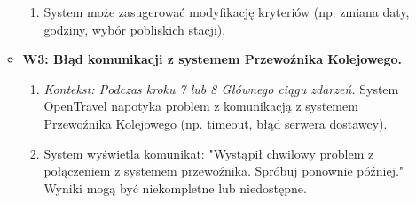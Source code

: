 \documentclass[a4paper,12pt]{article}
\begin{document}
\begin{itemize}
\begin{itemize}
\begin{enumerate}
\item System może zasugerować modyfikację kryteriów (np. zmiana daty, godziny, wybór pobliskich stacji).
\end{enumerate}
\item \textbf{W3: Błąd komunikacji z systemem Przewoźnika Kolejowego.}
\begin{enumerate}
\item \textit{Kontekst: Podczas kroku 7 lub 8 Głównego ciągu zdarzeń.} System OpenTravel napotyka problem z komunikacją z systemem Przewoźnika Kolejowego (np. timeout, błąd serwera dostawcy).
\item System wyświetla komunikat: "Wystąpił chwilowy problem z połączeniem z systemem przewoźnika. Spróbuj ponownie później." Wyniki mogą być niekompletne lub niedostępne.
\end{enumerate}
\end{itemize}
\end{itemize}
\end{document}
